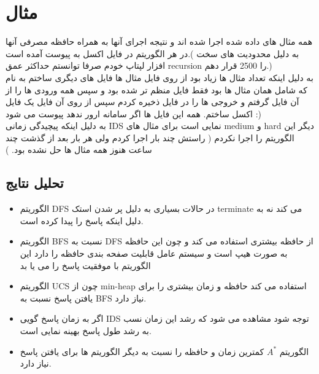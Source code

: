 \documentclass{article}
\begin{document}
    \section{مثال}
        همه مثال های داده شده اجرا شده اند و نتیجه اجرای آنها به همراه حافظه مصرفی آنها در هر الگوریتم در فایل اکسل به پیوست آمده است.( به دلیل محدودیت های سخت افزار لپتاپ خودم صرفا توانستم حداکثر عمق recursion را 2500 قرار دهم.)\\
        به دلیل اینکه تعداد مثال ها زیاد بود از روی فایل مثال ها فایل های دیگری ساختم به نام 
         که شامل همان مثال ها بود فقط فایل منظم تر شده بود و سپس همه ورودی ها را از آن فایل گرفتم و خروجی ها را در فایل 
         ذخیره کردم سپس از روی آن فایل یک فایل اکسل ساختم.
        همه این فایل ها اگر سامانه ارور ندهد پیوست می شود :)\\
        به دلیل اینکه پیچیدگی زمانی IDS نمایی است برای مثال های medium و hard دیگر این الگوریتم را اجرا نکردم ( راستش چند بار اجرا کردم ولی هر بار بعد از گذشت چند ساعت هنوز همه مثال ها حل نشده بود. )
        \subsection{تحلیل نتایج}
            \begin{itemize}
            	\item الگوریتم DFS در حالات بسیاری به دلیل پر شدن استک terminate می کند نه به دلیل اینکه پاسخ را پیدا کرده است.
            	\item الگوریتم BFS‌ نسبت به DFS از حافظه بیشتری استفاده می کند و چون این حافظه به صورت هیپ است و سیستم عامل قابلیت صفحه بندی حافظه را دارد این الگوریتم با موفقیت پاسخ را می یا بد
            	\item الگوریتم UCS چون از min-heap استفاده می کند حافظه و زمان بیشتری را برای یافتن پاسخ نسبت به BFS نیاز دارد.
            	\item اگر به زمان پاسخ گویی IDS توجه شود مشاهده می شود که رشد این زمان نسب به رشد طول پاسخ بهینه نمایی است.
            	\item الگوریتم $A^*$ کمترین زمان و حافظه را نسبت به دیگر الگوریتم ها برای یافتن پاسخ نیاز دارد.
            \end{itemize}
        
\end{document}
